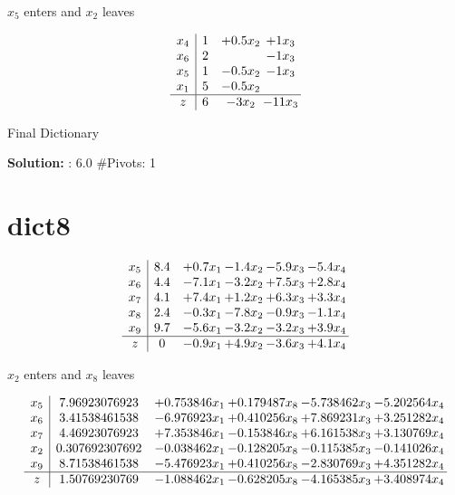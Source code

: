 \documentclass[10pt]{article}
\begin{document}
 $ x_{5} $ enters and $ x_{2} $ leaves 

 \[\begin{array}{c| c c@{\hskip 2pt} c@{\hskip 2pt} }
 x_{4}   &  1 & + 0.5 x_{2} & + 1  x_{3}\\
 x_{6}   &  2  &   & -1  x_{3}\\
 x_{5}   &  1 & -0.5 x_{2} & -1  x_{3}\\
 x_{1}   &  5 & -0.5 x_{2} &   \\
\hline
z    &  6 & -3  x_{2} & -11  x_{3}\\
\end{array}\]


 Final Dictionary
\par \noindent\textbf{Solution:} :  6.0
\#Pivots:  1
\section{dict8}

\[\begin{array}{c| c c@{\hskip 2pt} c@{\hskip 2pt} c@{\hskip 2pt} c@{\hskip 2pt} }
 x_{5}   &  8.4 & + 0.7 x_{1} & -1.4 x_{2} & -5.9 x_{3} & -5.4 x_{4}\\
 x_{6}   &  4.4 & -7.1 x_{1} & -3.2 x_{2} & + 7.5 x_{3} & + 2.8 x_{4}\\
 x_{7}   &  4.1 & + 7.4 x_{1} & + 1.2 x_{2} & + 6.3 x_{3} & + 3.3 x_{4}\\
 x_{8}   &  2.4 & -0.3 x_{1} & -7.8 x_{2} & -0.9 x_{3} & -1.1 x_{4}\\
 x_{9}   &  9.7 & -5.6 x_{1} & -3.2 x_{2} & -3.2 x_{3} & + 3.9 x_{4}\\
\hline
z    &  0 & -0.9 x_{1} & + 4.9 x_{2} & -3.6 x_{3} & + 4.1 x_{4}\\
\end{array}\]


 $ x_{2} $ enters and $ x_{8} $ leaves 

 \[\begin{array}{c| c c@{\hskip 2pt} c@{\hskip 2pt} c@{\hskip 2pt} c@{\hskip 2pt} }
 x_{5}   &  7.96923076923 & + 0.753846 x_{1} & + 0.179487 x_{8} & -5.738462 x_{3} & -5.202564 x_{4}\\
 x_{6}   &  3.41538461538 & -6.976923 x_{1} & + 0.410256 x_{8} & + 7.869231 x_{3} & + 3.251282 x_{4}\\
 x_{7}   &  4.46923076923 & + 7.353846 x_{1} & -0.153846 x_{8} & + 6.161538 x_{3} & + 3.130769 x_{4}\\
 x_{2}   &  0.307692307692 & -0.038462 x_{1} & -0.128205 x_{8} & -0.115385 x_{3} & -0.141026 x_{4}\\
 x_{9}   &  8.71538461538 & -5.476923 x_{1} & + 0.410256 x_{8} & -2.830769 x_{3} & + 4.351282 x_{4}\\
\hline
z    &  1.50769230769 & -1.088462 x_{1} & -0.628205 x_{8} & -4.165385 x_{3} & + 3.408974 x_{4}\\
\end{array}\]
\end{document}
